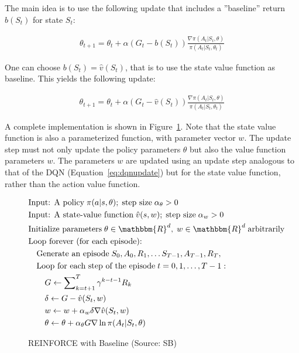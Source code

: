 The main idea is to use the following update that includes a ''baseline'' return $b(S_t)$ for state $S_t$:

\begin{align*}
\theta_{t+1} = \theta_t + \alpha(G_t - b(S_t)) \frac{\nabla \pi(A_t | S_t, \theta)}{\pi(A_t | S_t, \theta_t)}
\end{align*}

One can choose $b(S_t) = \hat{v}(S_t)$, that is to use the state value function as baseline. This yields the following update:

\begin{align*}
\theta_{t+1} = \theta_t + \alpha(G_t - \hat{v}(S_t)) \frac{\nabla \pi(A_t | S_t, \theta)}{\pi(A_t | S_t, \theta_t)}
\end{align*}

A complete implementation is shown in Figure~\ref{fig:reinforcebaseline}. Note that the state value function is also a parameterized function, with parameter vector $w$. The update step must not only update the policy parameters $\theta$ but also the value function parameters $w$. The parameters $w$ are updated using an update step analogous to that of the DQN (Equation~\ref{eq:dqnupdate}) but for the state value function, rather than the action value function.

\begin{figure}
\small
\begin{tcolorbox}[colback=code]
\vspace{-\baselineskip}
\begin{align*}
& \text{Input: A policy}\;\pi(a | s, \theta);\;\text{step size}\; \alpha_\theta > 0 \\
& \text{Input: A state-value function}\;\hat{v}(s, w);\;\text{step size}\; \alpha_w > 0 \\
& \text{Initialize parameters}\; \theta \in \mathbbm{R}^d,\; w \in \mathbbm{R}^d\;\text{arbitrarily} \\
& \text{Loop forever (for each episode):} \\
& \quad \text{Generate an episode}\; S_0, A_0, R_1, \ldots S_{T-1}, A_{T-1}, R_T, \hspace{1in} \\
& \quad \text{Loop for each step of the episode}\;t=0, 1, \ldots, T-1:\\
& \quad \quad G \leftarrow \sum\nolimits_{k=t+1}^T \gamma^{k - t - 1}R_k \\
& \quad \quad \delta \leftarrow G - \hat{v}(S_t, w) \\
& \quad \quad w \leftarrow w + \alpha_w \delta \nabla \hat{v}(S_t, w) \\
& \quad \quad \theta \leftarrow \theta + \alpha_\theta G \nabla \ln \pi(A_t | S_t, \theta)
\end{align*}
\end{tcolorbox}
\caption[REINFORCE with Baseline]{REINFORCE with Baseline (Source: SB)}
\label{fig:reinforcebaseline}
\end{figure}

